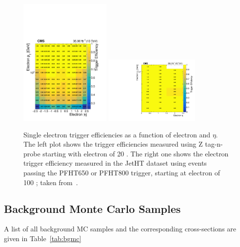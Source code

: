 \begin{figure}[h!]
  \begin{center}
          \includegraphics[width=0.40\textwidth]{figures/trigs/trgeff_ele_pt35.pdf}
          \includegraphics[width=0.42\textwidth]{figures/trigs/effetapt_jetht.pdf}
   \caption{Single electron trigger efficiencies as a function of electron \pt and $\eta$. The left plot shows the trigger efficiencies measured using Z tag-n-probe starting with electron \pt of 20 \GeV. The right one shows the electron trigger efficiency measured in the JetHT dataset using events passing the PFHT650 or PFHT800 trigger, starting at electron \pt of 100 \GeV; taken from~\cite{CMS_AN_2016-473}.}
   \label{fig:eltrigsfsplot}
  \end{center}
\end{figure}


\subsection{Background Monte Carlo Samples}

A list of all background MC samples and the corresponding cross-sections are given in Table~\ref{tab:bgmc}

